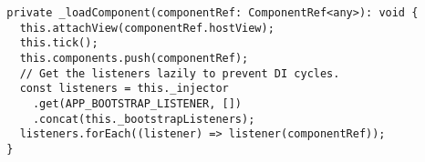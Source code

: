 \begin{verbatim}
  private _loadComponent(componentRef: ComponentRef<any>): void {
    this.attachView(componentRef.hostView);
    this.tick();
    this.components.push(componentRef);
    // Get the listeners lazily to prevent DI cycles.
    const listeners = this._injector
      .get(APP_BOOTSTRAP_LISTENER, [])
      .concat(this._bootstrapListeners);
    listeners.forEach((listener) => listener(componentRef));
  }
\end{verbatim}
